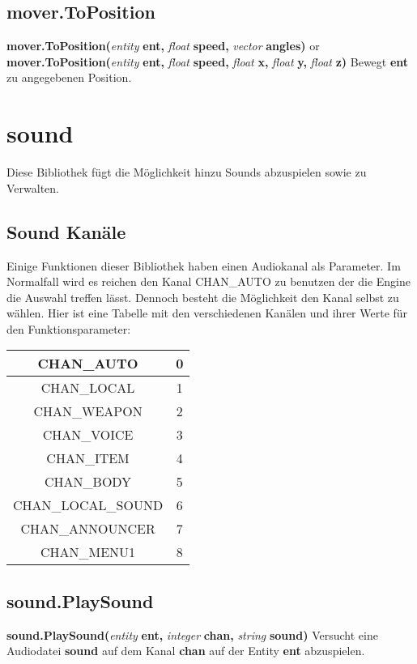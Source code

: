 \documentclass[11pt,a4paper]{book}
\begin{document}
\subsection{mover.ToPosition}
\label{mver-toposition}
\textbf{mover.ToPosition(}\textit{entity}\textbf{ ent, }\textit{float}\textbf{ speed, }\textit{vector}\textbf{ angles)} or
\newline
\textbf{mover.ToPosition(}\textit{entity}\textbf{ ent, }\textit{float}\textbf{ speed, }\textit{float}\textbf{ x, }\textit{float}\textbf{ y, }\textit{float}\textbf{ z)}
\newline
Bewegt \textbf{ent} zu angegebenen Position.
\newpage
\section{sound}
\label{sound}
Diese Bibliothek fügt die Möglichkeit hinzu Sounds abzuspielen sowie zu Verwalten.
\subsection{Sound Kanäle}
\label{sound-chan}
Einige Funktionen dieser Bibliothek haben einen Audiokanal als Parameter. Im Normalfall wird es reichen den Kanal CHAN\_AUTO zu benutzen der die Engine die Auswahl treffen lässt. Dennoch besteht die Möglichkeit den Kanal selbst zu wählen.
\newline
Hier ist eine Tabelle mit den verschiedenen Kanälen und ihrer Werte für den Funktionsparameter:
\newline
\begin{center}
\begin{tabular}[c]{| c | c |}
\hline
CHAN\_AUTO & 0 \\
\hline
CHAN\_LOCAL & 1 \\
\hline
CHAN\_WEAPON & 2 \\
\hline
CHAN\_VOICE & 3 \\
\hline
CHAN\_ITEM & 4 \\
\hline
CHAN\_BODY & 5 \\
\hline
CHAN\_LOCAL\_SOUND & 6 \\
\hline
CHAN\_ANNOUNCER & 7 \\
\hline
CHAN\_MENU1 & 8 \\
\hline
\end{tabular}
\end{center}
\subsection{sound.PlaySound}
\label{snd-playsnd}
\textbf{sound.PlaySound(}\textit{entity}\textbf{ ent, }\textit{integer}\textbf{ chan, }\textit{string}\textbf{ sound)}
\newline
Versucht eine Audiodatei \textbf{sound} auf dem Kanal \textbf{chan} auf der Entity \textbf{ent} abzuspielen.
\newpage
\end{document}

